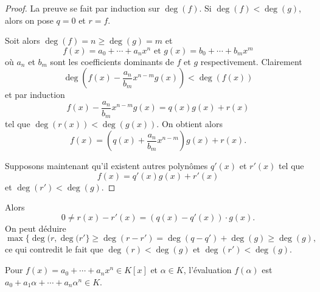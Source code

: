 \begin{proof}
  La preuve se fait par induction sur $\deg(f)$. Si $\deg(f) < \deg(g)$, alors on pose $q = 0$ et $r = f$.

Soit alors $\deg(f) = n \geq \deg(g)=m$ et 
\begin{displaymath}
  f(x) = a_0+ \cdots +a_n x^n \text{ et } g(x) = b_0 + \cdots + b_m x^m 
\end{displaymath}
où $a_n$ et $b_m$ sont les coefficients dominants de $f$ et $g$ respectivement. 
Clairement 
\begin{displaymath}
  \deg\left( f(x) - \frac{a_n}{ b_m } x^{n-m} g(x) \right) < \deg(f(x))
\end{displaymath}
et par induction 
\begin{displaymath}
  f(x) - \frac{a_n}{ b_m } x^{n-m} g(x)  = q(x) g(x) + r(x) 
\end{displaymath}
tel que $\deg(r(x)) < \deg(g(x))$. On  obtient alors
\begin{displaymath}
  f(x) = (q(x) + \frac{a_n}{ b_m } x^{n-m} ) g(x) + r(x). 
\end{displaymath}

Supposons maintenant qu'il existent autres polynômes $q'(x)$ et $r'(x)$ tel que 
\begin{displaymath}
    f(x) = q'(x) g(x) + r'(x) 
  \end{displaymath}
  et $\deg(r') < \deg(g)$. 
\end{proof}
Alors 
\begin{displaymath}
0 \neq   r(x) - r'(x) = (q(x) - q'(x)) ⋅ g(x). 
\end{displaymath}
On peut déduire 
\begin{displaymath}
\max\{\deg(r,\deg(r'\} \geq   \deg( r - r')  = \deg(q - q') + \deg(g) \geq \deg(g), 
\end{displaymath}
ce qui contredit le fait que $\deg(r) < \deg(g)$ et $\deg(r') < \deg(g)$. 

\begin{definition}
  Pour $f(x)  = a_0 + \cdots + a_n x^n \in K[x]$ et $\alpha \in K$, l'évaluation $f(\alpha)$ est $ a_0 + a_1 \alpha + \cdots + a_n \alpha^n \in K$. 
\end{definition}



